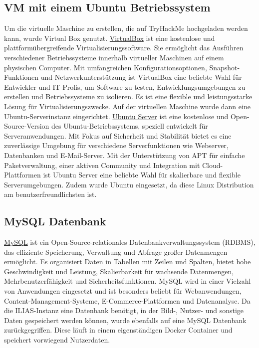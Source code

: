 \documentclass[10pt, a4paper,onecolumn ,titlepage]{article}
\begin{document}
    \subsection{VM mit einem Ubuntu Betriebssystem}
    \label{subsec:ubuntu}
    Um die virtuelle Maschine zu erstellen, die auf TryHackMe hochgeladen werden kann, wurde Virtual Box genutzt.
    \href{https://www.virtualbox.org/}{VirtualBox} ist eine kostenlose und plattformübergreifende Virtualisierungssoftware.
    Sie ermöglicht das Ausführen verschiedener Betriebssysteme innerhalb virtueller Maschinen auf einem physischen Computer.
    Mit umfangreichen Konfigurationsoptionen, Snapshot-Funktionen und Netzwerkunterstützung ist VirtualBox eine beliebte Wahl für Entwickler und IT-Profis, um Software zu testen, Entwicklungsumgebungen zu erstellen und Betriebssysteme zu isolieren.
    Es ist eine flexible und leistungsstarke Lösung für Virtualisierungszwecke.
    Auf der virtuellen Maschine wurde dann eine Ubuntu-Serverinstanz eingerichtet.
    \href{https://ubuntu.com/server}{Ubuntu Server} ist eine kostenlose und Open-Source-Version des Ubuntu-Betriebssystems, speziell entwickelt für Serveranwendungen.
    Mit Fokus auf Sicherheit und Stabilität bietet es eine zuverlässige Umgebung für verschiedene Serverfunktionen wie Webserver, Datenbanken und E-Mail-Server.
    Mit der Unterstützung von APT für einfache Paketverwaltung, einer aktiven Community und Integration mit Cloud-Plattformen ist Ubuntu Server eine beliebte Wahl für skalierbare und flexible Serverumgebungen.
    Zudem wurde Ubuntu eingesetzt, da diese Linux Distribution am benutzerfreundlichsten ist.


    \subsection{MySQL Datenbank}
    \label{subsec:mysqlDatenbank}
    \href{https://www.mysql.com/}{MySQL} ist ein Open-Source-relationales Datenbankverwaltungssystem (RDBMS), das effiziente Speicherung, Verwaltung und Abfrage großer Datenmengen ermöglicht.
    Es organisiert Daten in Tabellen mit Zeilen und Spalten, bietet hohe Geschwindigkeit und Leistung, Skalierbarkeit für wachsende Datenmengen, Mehrbenutzerfähigkeit und Sicherheitsfunktionen.
    MySQL wird in einer Vielzahl von Anwendungen eingesetzt und ist besonders beliebt für Webanwendungen, Content-Management-Systeme, E-Commerce-Plattformen und Datenanalyse.
    Da die ILIAS-Instanz eine Datenbank benötigt, in der Bild-, Nutzer- und sonstige Daten gespeichert werden können, wurde ebenfalls auf eine MySQL Datenbank zurückgegriffen.
    Diese läuft in einem eigenständigen Docker Container und speichert vorwiegend Nutzerdaten.
\end{document}

